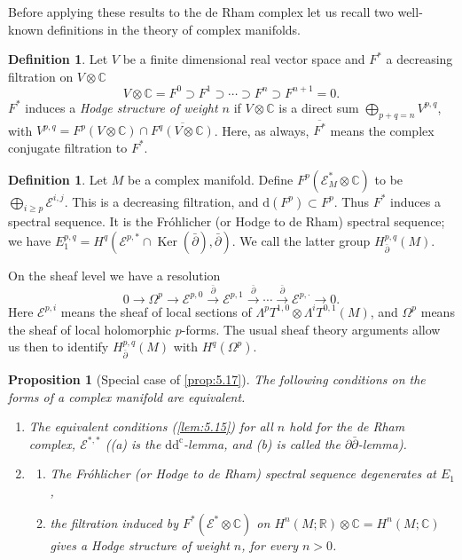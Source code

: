 \documentclass[11pt]{amsart}
\theoremstyle{plain}
\newtheorem{proposition}[theorem]{Proposition}
\theoremstyle{definition}
\newtheorem{definition}[theorem]{Definition}
\DeclareMathOperator{\Ker}{Ker}
\newcommand{\sE}{\mathscr{E}}
\newcommand{\dd}{\mathrm{d}}
\newcommand{\dc}{\mathrm{d}^{\mathrm{c}}}
\newcommand{\CC}{\mathbb{C}}
\newcommand{\RR}{\mathbb{R}}
\begin{document}
Before applying these results to the de Rham complex let us recall two well-known definitions in the theory of complex manifolds.

\begin{definition}\label{def:5.19}
Let $V$ be a finite dimensional real vector space and $F^{*}$ a decreasing filtration on $V \otimes \CC$
\[
V \otimes \CC = F^{0} \supset F^{1} \supset \cdots \supset F^{n} \supset F^{n+1} = 0.
\]
$F^{*}$ induces a \emph{Hodge structure of weight $n$} if $V \otimes \CC$ is a direct sum $\bigoplus_{p+q=n} V^{p,q}$, with $V^{p,q} = F^{p}(V \otimes \CC) \cap \overline{F^{q}(V \otimes \CC)}$. Here, as always, $\overline{F^{*}}$ means the complex conjugate filtration to $F^{*}$.
\end{definition}

\begin{definition}\label{def:5.20}
Let $M$ be a complex manifold. Define $F^{p}(\sE^{*}_{M} \otimes \CC)$ to be $\bigoplus_{i \ge p} \sE^{i,j}$. This is a decreasing filtration, and $\dd(F^{p}) \subset F^{p}$. Thus $F^{*}$ induces a spectral sequence. It is the Fr\'{o}hlicher (or Hodge to de Rham) spectral sequence; we have $E^{p,q}_{1} = H^{q}(\sE^{p,*} \cap \Ker(\bar{\partial}), \bar{\partial})$. We call the latter group $H^{p,q}_{\bar{\partial}}(M)$.
\end{definition}

On the sheaf level we have a resolution
\[
0 \longrightarrow \Omega^{p} \longrightarrow \sE^{p,0} \xrightarrow{\bar{\partial}} \sE^{p,1} \xrightarrow{\bar{\partial}} \cdots \xrightarrow{\bar{\partial}} \sE^{p,\cdot} \longrightarrow 0.
\]
Here $\sE^{p,i}$ means the sheaf of local sections of $\Lambda^{p} T^{1,0} \otimes \Lambda^{i} T^{0,1}(M)$, and $\Omega^{p}$ means the sheaf of local holomorphic $p$-forms. The usual sheaf theory arguments allow us then to identify $H^{p,q}_{\bar{\partial}}(M)$ with $H^{q}(\Omega^{p})$.

\begin{proposition}[Special case of \ref{prop:5.17}]\label{prop:5.21}
The following conditions on the forms of a complex manifold are equivalent.
\begin{enumerate}
\item[(1)] The equivalent conditions (\ref{lem:5.15}) for all $n$ hold for the de Rham complex, $\sE^{*,*}$ ((a) is the $\dd\dc$-lemma, and (b) is called the $\partial\bar{\partial}$-lemma).
\item[(2)]
\begin{enumerate}
\item[(a)] The Fr\'{o}hlicher (or Hodge to de Rham) spectral sequence degenerates at $E_{1}$,
\item[(b)] the filtration induced by $F^{*}(\sE^{*} \otimes \CC)$ on $H^{n}(M; \RR) \otimes \CC = H^{n}(M; \CC)$ gives a Hodge structure of weight $n$, for every $n > 0$.
\end{enumerate}
\end{enumerate}
\end{proposition}
\end{document}
